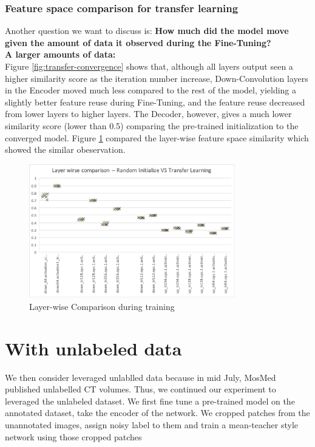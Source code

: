\subsubsection{Feature space comparison for transfer learning} 
Another question we want to discuss is: \textbf{How much did the model move given the amount of data it observed during the Fine-Tuning?}\\

\textbf{A larger amounts of data:}\\
Figure \ref{fig:transfer-convergence} shows that, although all layers output seen a higher similarity score as the iteration number increase, 
Down-Convolution layers in the Encoder moved much less compared to the rest of the model, yielding a slightly better feature reuse during Fine-Tuning, and the feature reuse decreased from lower layers to higher layers. The Decoder, however, gives a much lower similarity score (lower than 0.5) comparing the pre-trained initialization to the converged model. Figure \ref{fig:layer-wise-comparison} compared the layer-wise feature space similarity which showed the similar obeservation.

\begin{figure}
	\centering
	\includegraphics[width=0.8\textwidth]{img/SVCCA/randvstansfer-init2converge.png}
	\caption{Layer-wise Comparison during training}
	\label{fig:layer-wise-comparison}
\end{figure}

{\color{red}{We then trained the model using only 5 volumed sliced into 2D......}}

\section{With unlabeled data}
We then consider leveraged unlablled data because in mid July, MosMed published unlabelled CT volumes. Thus, we continued our experiment to leveraged the unlabeled dataset. 
 We first fine tune a pre-trained model on the annotated dataset, take the encoder of the network. We cropped patches from the unannotated images, assign noisy label to them and train a mean-teacher style network using those cropped patches

